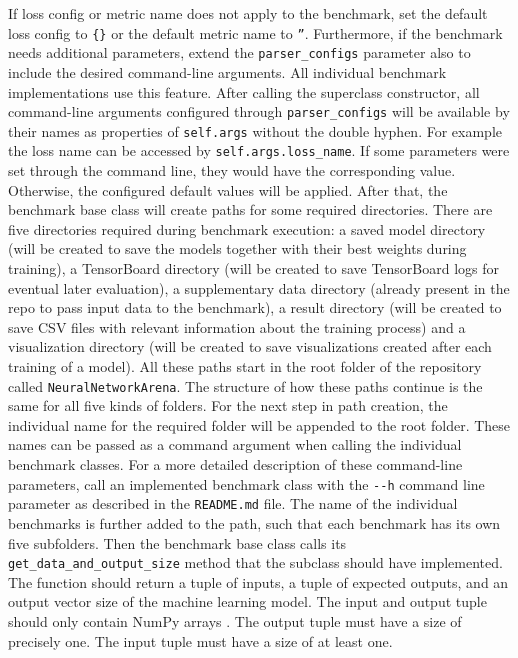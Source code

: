 \documentclass[draft,final]{vutinfth} %
\begin{document}
If loss config or metric name does not apply to the benchmark, set the default loss config to \texttt{\{\}} or the default metric name to \texttt{''}.
Furthermore, if the benchmark needs additional parameters, extend the \texttt{parser\_configs} parameter also to include the desired command-line arguments.
All individual benchmark implementations use this feature.
After calling the superclass constructor, all command-line arguments configured through \texttt{parser\_configs} will be available by their names as properties of \texttt{self.args} without the double hyphen.
For example the loss name can be accessed by \texttt{self.args.loss\_name}.
If some parameters were set through the command line, they would have the corresponding value. Otherwise, the configured default values will be applied.
After that, the benchmark base class will create paths for some required directories.
There are five directories required during benchmark execution: a saved model directory (will be created to save the models together with their best weights during training), a TensorBoard directory (will be created to save TensorBoard logs for eventual later evaluation), a supplementary data directory (already present in the repo to pass input data to the benchmark), a result directory (will be created to save CSV files with relevant information about the training process) and a visualization directory (will be created to save visualizations created after each training of a model).
All these paths start in the root folder of the repository called \texttt{NeuralNetworkArena}.
The structure of how these paths continue is the same for all five kinds of folders.
For the next step in path creation, the individual name for the required folder will be appended to the root folder.
These names can be passed as a command argument when calling the individual benchmark classes.
For a more detailed description of these command-line parameters, call an implemented benchmark class with the \texttt{-{}-h} command line parameter as described in the \texttt{README.md} file.
The name of the individual benchmarks is further added to the path, such that each benchmark has its own five subfolders.
Then the benchmark base class calls its \texttt{get\_data\_and\_output\_size} method that the subclass should have implemented.
The function should return a tuple of inputs, a tuple of expected outputs, and an output vector size of the machine learning model.
The input and output tuple should only contain NumPy arrays \cite{numpy}. The output tuple must have a size of precisely one.
The input tuple must have a size of at least one.
\end{document}
